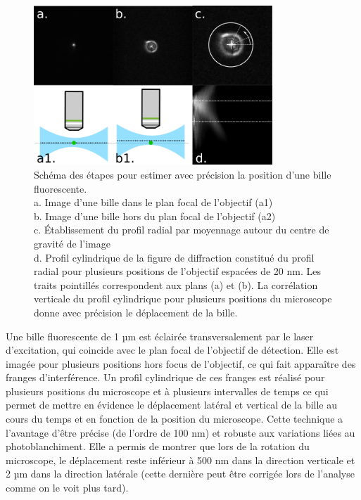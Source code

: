 \begin{figure}
\centering
\includegraphics[width=0.8\textwidth]{./files/bead_position.svg.png}
\caption{Schéma des étapes pour estimer avec précision la position d'une bille fluorescente.\\
a. Image d'une bille dans le plan focal de l'objectif (a1)\\
b. Image d'une bille hors du plan focal de l'objectif (a2)\\
c. Établissement du profil radial par moyennage autour du centre de gravité de l'image\\
d. Profil cylindrique de la figure de diffraction constitué du profil radial pour plusieurs positions de l'objectif espacées de 20 nm. Les traits pointillés correspondent aux plans (a) et (b). La corrélation verticale du profil cylindrique pour plusieurs positions du microscope donne avec précision le déplacement de la bille.}
\end{figure}

Une bille fluorescente de 1 µm est éclairée transversalement par le laser d'excitation, qui coincide avec le plan focal de l'objectif de détection. Elle est imagée pour plusieurs positions hors focus de l'objectif, ce qui fait apparaître des franges d'interférence. Un profil cylindrique de ces franges est réalisé pour plusieurs positions du microscope et à plusieurs intervalles de temps ce qui permet de mettre en évidence le déplacement latéral et vertical de la bille au cours du temps et en fonction de la position du microscope. Cette technique a l'avantage d'être précise (de l'ordre de 100 nm) et robuste aux variations liées au photoblanchiment. Elle a permis de montrer que lors de la rotation du microscope, le déplacement reste inférieur à 500 nm dans la direction verticale et 2 µm dans la direction latérale (cette dernière peut être corrigée lors de l'analyse comme on le voit plus tard).

